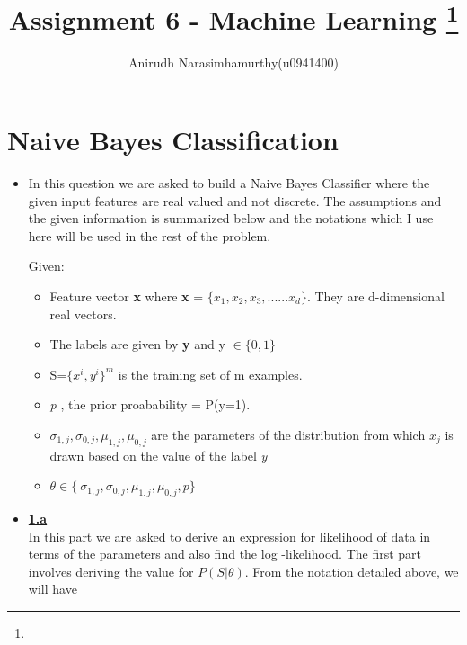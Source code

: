 \documentclass[11pt]{article}
\title{Assignment 6 - Machine Learning
\footnote{\s{CS 6350 ; \;\; Spring 2015 \hfill}
}
}
\author{Anirudh Narasimhamurthy(u0941400)}
\begin{document}
\maketitle

\lstset{language=python} 


\section{Naive Bayes Classification}

\begin{itemize}
	\item[] 
	
	In this question we are asked to build a Naive Bayes Classifier where the given input features are real valued and not discrete. The assumptions and the given information is summarized below and the notations which I use here will be used in the rest of the problem.
	
	Given:
	
	\begin{itemize}

	\item Feature vector \textbf{x} where \textbf{x} = $\{x_1, x_2, x_3, ......x_d\}.$ They are d-dimensional real vectors.
	\item The labels are given by \textbf{y} and y $\in\{0,1\}$
	\item S=$\{x^i, y^i\}^m$ is the training set of m examples.
	\item  \emph{p} , the prior proabability = P(y=1).
	\item $\sigma_{1,j} , \sigma_{0,j} ,\mu_{1,j}, \mu_{0,j} $ are the parameters of the distribution from which $x_j$ is drawn based on the value of the label \emph y
	
	\item $\theta \in \{\ \sigma_{1,j} , \sigma_{0,j} ,\mu_{1,j}, \mu_{0,j}, p\} $
	\end{itemize}

	\item[] \textbf{\underline{1.a}} \\
	
	In this part we are asked to derive an expression for likelihood of data in terms of the parameters and also find the log -likelihood. The first part involves deriving the value for $P(S | \theta )$. From the notation detailed above, we will have \\
	

\end{itemize}
\end{document}
